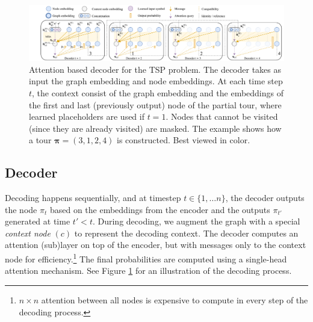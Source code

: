 \begin{figure}[t]
\begin{center}
\centerline{\includegraphics[trim={50 0 0 0},clip,width=\textwidth]{./images/Decoder}}
\caption{Attention based decoder for the TSP problem. The decoder takes as input the graph embedding and node embeddings. At each time step $t$, the context consist of the graph embedding and the embeddings of the first and last (previously output) node of the partial tour, where learned placeholders are used if $t = 1$. Nodes that cannot be visited (since they are already visited) are masked. The example shows how a tour $\bm{\pi} = (3, 1, 2, 4)$ is constructed. Best viewed in color.}
\label{fig:decoder}
\end{center}
\vskip -0.2in
\end{figure}

\subsection{Decoder}
Decoding happens sequentially, and at timestep $t \in \{1, \ldots n\}$, the decoder outputs the node $\pi_t$ based on the embeddings from the encoder and the outputs $\pi_{t'}$ generated at time $t' < t$. During decoding, we augment the graph with a special \emph{context node} $(c)$ to represent the decoding context. The decoder computes an attention (sub)layer on top of the encoder, but with messages only to the context node for efficiency.\footnote{$n \times n$ attention between all nodes is expensive to compute in every step of the decoding process.} The final probabilities are computed using a single-head attention mechanism. See Figure \ref{fig:decoder} for an illustration of the decoding process.

